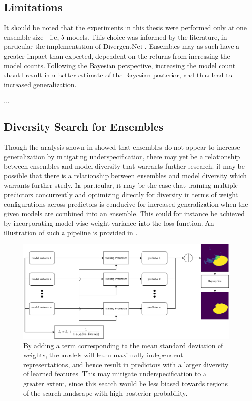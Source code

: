     \subsection{Limitations}
    It should be noted that the experiments in this thesis were performed only at one ensemble size - i.e, 5 models. This choice was informed by the literature, in particular the implementation of DivergentNet \cite{divergentnets}. Ensembles may as such have a greater impact than expected, dependent on the returns from increasing the model counts. Following the Bayesian perspective, increasing the model count should result in a better estimate of the Bayesian posterior, and thus lead to increased generalization. 
    
    ...     
    
    \subsection{Diversity Search for Ensembles}
    Though the analysis shown in  showed that ensembles do not appear to increase generalization by mitigating underspecification, there may yet be a relationship between ensembles and model-diversity that warrants further research. it may be possible that there is a relationship between ensembles and model diversity which warrants further study. In particular, it may be the case that training multiple predictors concurrently and optimizing directly for diversity in terms of weight configurations across predictors is conducive for increased generalization when the given models are combined into an ensemble. This could for instance be achieved by incorporating model-wise weight variance into the loss function. An illustration of such a pipeline is provided in .
    
    \begin{figure}
        \centering
        \includegraphics[width=\linewidth]{illustrations/diversity_search.png}
        \caption[Deep Diversity Search]{By adding a term corresponding to the mean standard deviation of weights, the models will learn maximally independent representations, and hence result in predictors with a larger diversity of learned features. This may mitigate underspecification to a greater extent, since this search would be less biased towards regions of the search landscape with high posterior probability.}
        \label{fig:diversity}
    \end{figure}


